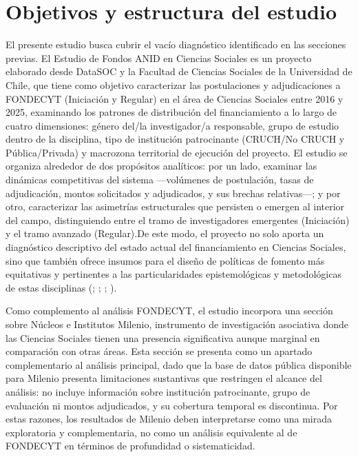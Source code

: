 \documentclass[
  spanish,
  a4paper,
  oneside]{scrbook}
\begin{document}
\section{Objetivos y estructura del
estudio}\label{objetivos-y-estructura-del-estudio}

El presente estudio busca cubrir el vacío diagnóstico identificado en
las secciones previas. El Estudio de Fondos ANID en Ciencias Sociales es
un proyecto elaborado desde DataSOC y la Facultad de Ciencias Sociales
de la Universidad de Chile, que tiene como objetivo caracterizar las
postulaciones y adjudicaciones a FONDECYT (Iniciación y Regular) en el
área de Ciencias Sociales entre 2016 y 2025, examinando los patrones de
distribución del financiamiento a lo largo de cuatro dimensiones: género
del/la investigador/a responsable, grupo de estudio dentro de la
disciplina, tipo de institución patrocinante (CRUCH/No CRUCH y
Pública/Privada) y macrozona territorial de ejecución del proyecto. El
estudio se organiza alrededor de dos propósitos analíticos: por un lado,
examinar las dinámicas competitivas del sistema ---volúmenes de
postulación, tasas de adjudicación, montos solicitados y adjudicados, y
sus brechas relativas---; y por otro, caracterizar las asimetrías
estructurales que persisten o emergen al interior del campo,
distinguiendo entre el tramo de investigadores emergentes (Iniciación) y
el tramo avanzado (Regular).De este modo, el proyecto no solo aporta un
diagnóstico descriptivo del estado actual del financiamiento en Ciencias
Sociales, sino que también ofrece insumos para el diseño de políticas de
fomento más equitativas y pertinentes a las particularidades
epistemológicas y metodológicas de estas disciplinas
(;
;
;
).

Como complemento al análisis FONDECYT, el estudio incorpora una sección
sobre Núcleos e Institutos Milenio, instrumento de investigación
asociativa donde las Ciencias Sociales tienen una presencia
significativa aunque marginal en comparación con otras áreas. Esta
sección se presenta como un apartado complementario al análisis
principal, dado que la base de datos pública disponible para Milenio
presenta limitaciones sustantivas que restringen el alcance del
análisis: no incluye información sobre institución patrocinante, grupo
de evaluación ni montos adjudicados, y su cobertura temporal es
discontinua. Por estas razones, los resultados de Milenio deben
interpretarse como una mirada exploratoria y complementaria, no como un
análisis equivalente al de FONDECYT en términos de profundidad o
sistematicidad.
\end{document}
